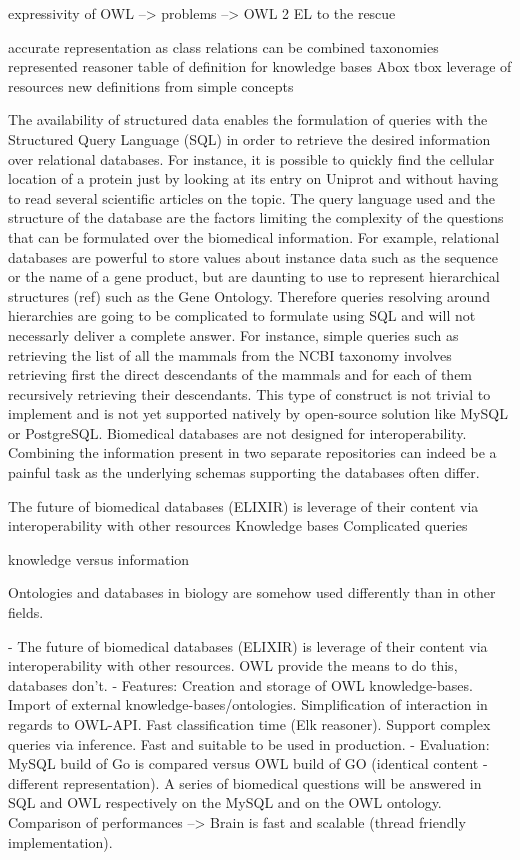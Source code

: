 \documentclass{bioinfo}
\begin{document}
expressivity of OWL --> problems --> OWL 2 EL to the rescue

accurate representation as class
relations can be combined
taxonomies represented
reasoner
table of definition for knowledge bases
Abox tbox
leverage of resources
new definitions from simple concepts



The availability of structured data enables the formulation of queries with the Structured Query Language (SQL) in order to retrieve the desired 
information over relational databases. For instance, it is possible to
quickly find the cellular location of a protein just by looking at its entry on Uniprot and without having to read several scientific articles
on the topic. The query language used and the structure of the database are the factors limiting the complexity of the questions that can be 
formulated over the biomedical information. For example, relational databases are powerful to store values about instance data such as the
sequence or the name of a gene product, but are daunting to use to represent hierarchical structures (ref) such as the Gene Ontology. Therefore
queries resolving around hierarchies are going to be complicated to formulate using SQL and will not necessarly deliver a complete answer. For
instance, simple queries such as retrieving the list of all the mammals from the NCBI taxonomy involves retrieving first the direct descendants
of the mammals and for each of them recursively retrieving their descendants. This type of construct is not trivial to implement
and is not yet supported natively by open-source solution like MySQL or PostgreSQL.
Biomedical databases are not designed for interoperability. Combining the information present in
two separate repositories can indeed be a painful task as the underlying schemas supporting the databases often differ.


The future of biomedical databases (ELIXIR) is leverage of their content via interoperability with other resources
Knowledge bases
Complicated queries

knowledge versus information





Ontologies and databases in biology are somehow used differently than in other fields. 

- The future of biomedical databases (ELIXIR) is leverage of their content via interoperability with other resources.
OWL provide the means to do this, databases don't.
- Features: Creation and storage of OWL knowledge-bases. 
Import of external knowledge-bases/ontologies. 
Simplification of interaction in regards to OWL-API. Fast classification time (Elk reasoner). 
Support complex queries via inference. Fast and suitable to be used in production.
- Evaluation: MySQL build of Go is compared versus OWL build of GO (identical content - different representation).
A series of biomedical questions will be answered in SQL and OWL respectively on the MySQL and on the OWL ontology.
Comparison of performances --> Brain is fast and scalable (thread friendly implementation).
\end{document}
